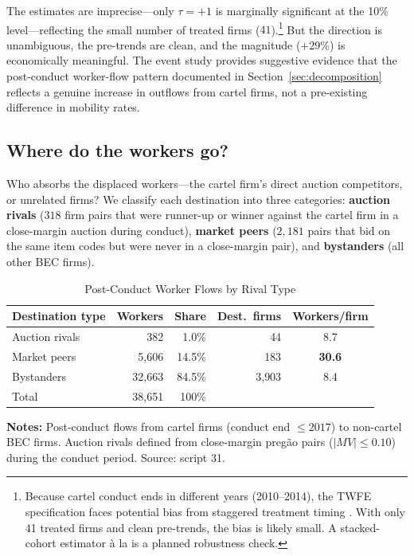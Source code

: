 The estimates are imprecise---only $\tau = +1$ is marginally significant at the 10\% level---reflecting the small number of treated firms ($41$).\footnote{Because cartel conduct ends in different years (2010--2014), the TWFE specification faces potential bias from staggered treatment timing \citep{goodman2021difference}. With only 41 treated firms and clean pre-trends, the bias is likely small. A stacked-cohort estimator \`{a} la \citet{cengiz2019effect} is a planned robustness check.} But the direction is unambiguous, the pre-trends are clean, and the magnitude ($+29\%$) is economically meaningful. The event study provides suggestive evidence that the post-conduct worker-flow pattern documented in Section~\ref{sec:decomposition} reflects a genuine increase in outflows from cartel firms, not a pre-existing difference in mobility rates.

\subsection{Where do the workers go?}\label{sec:rivalry}

Who absorbs the displaced workers---the cartel firm's direct auction competitors, or unrelated firms? We classify each destination into three categories: \textbf{auction rivals} ($318$ firm pairs that were runner-up or winner against the cartel firm in a close-margin auction during conduct), \textbf{market peers} ($2{,}181$ pairs that bid on the same item codes but were never in a close-margin pair), and \textbf{bystanders} (all other BEC firms).

\begin{table}[htbp]
\centering
\caption{Post-Conduct Worker Flows by Rival Type}\label{tab:rivalry}
\begin{tabular}{lrrrc}
\toprule
Destination type & Workers & Share & Dest.\ firms & Workers/firm \\
\midrule
Auction rivals & 382 & 1.0\% & 44 & 8.7 \\
Market peers & 5{,}606 & 14.5\% & 183 & \textbf{30.6} \\
Bystanders & 32{,}663 & 84.5\% & 3{,}903 & 8.4 \\
\midrule
Total & 38{,}651 & 100\% & & \\
\bottomrule
\end{tabular}
\vspace{0.5em}
\begin{minipage}{0.90\textwidth}
\scriptsize{\textbf{Notes:} Post-conduct flows from cartel firms (conduct end $\le 2017$) to non-cartel BEC firms. Auction rivals defined from close-margin preg\~{a}o pairs ($\lvert MV \rvert \le 0.10$) during the conduct period. Source: script 31.\par}
\end{minipage}
\end{table}

